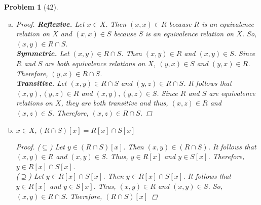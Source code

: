 \documentclass{article}
\theoremstyle{problem}
\newtheorem{prob}{Problem}
\theoremstyle{plain}
\theoremstyle{remark}
\begin{document}
\begin{prob}[42]\ \\[-1cm]
  \begin{enumerate}[a)]
    \item \begin{proof}
        \textbf{Reflexive.} Let $x \in X$. Then $(x,x) \in R$ because $R$ is an equivalence relation on $X$ and $(x,x) \in S$ because $S$ is an equivalence relation on $X$. So, $(x,y) \in R \cap S$.\\
        \textbf{Symmetric.} Let $(x,y) \in R \cap S$. Then $(x,y) \in R$ and $(x,y) \in S$. Since $R$ and $S$ are both equivalence relations on $X$, $(y,x) \in S$ and $(y,x) \in R$. Therefore, $(y,x) \in R \cap S$.\\
        \textbf{Transitive.} Let $(x,y) \in R \cap S$ and $(y,z) \in R \cap S$. It follows that $(x,y),(y,z) \in R$ and $(x,y),(y,z) \in S$. Since $R$ and $S$ are equivalence relations on $X$, they are both transitive and thus, $(x,z) \in R$ and $(x,z) \in S$. Therefore, $(x,z) \in R \cap S$.
        
      \end{proof}
    \item $x \in X, (R \cap S)[x] = R[x] \cap S[x]$\begin{proof}
        ($\subseteq$) Let $y \in (R \cap S)[x]$. Then $(x,y) \in (R \cap S)$. It follows that $(x,y) \in R$ and $(x,y) \in S$. Thus, $y \in R[x]$ and $y \in S[x]$. Therefore, $y \in R[x] \cap S[x]$.\\
        ($\supseteq$) Let $y \in R[x] \cap S[x]$. Then $y \in R[x] \cap S[x]$. It follows that $y \in R[x]$ and $y \in S[x]$. Thus, $(x,y) \in R$ and $(x,y) \in S$. So, $(x,y) \in R \cap S$. Therefore, $(R \cap S)[x]$
        
      \end{proof}
    \end{enumerate}
    
\end{prob}
%
\end{document}
